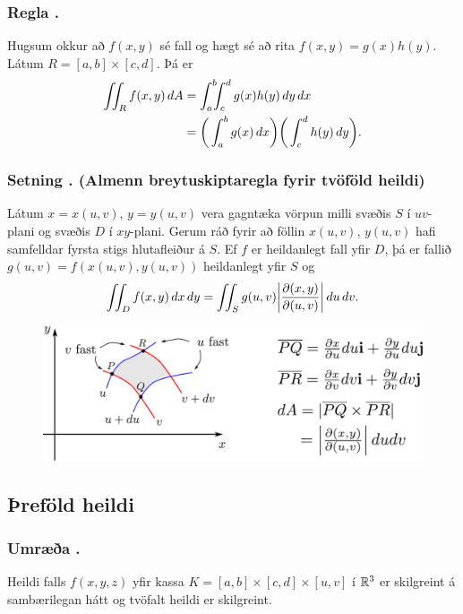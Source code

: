 \subsubsection{Regla \kaflanr.}
Hugsum okkur að $f(x,y)$ sé fall og hægt sé að rita
$f(x,y)=g(x)h(y)$.  Látum $R=[a,b]\times [c,d]$.  Þá er 
\begin{align*}
\int\!\!\!\int_R f(x,y)\,dA&=\int_a^b\!\!\!\int_{c}^{d}g(x)h(y)\,dy\, dx\\
&=\bigg(\int_a^b g(x)\,dx\bigg)\bigg(\int_c^d h(y)\,dy\bigg).
\end{align*}

 

\subsubsection{Setning \kaflanr. (Almenn breytuskiptaregla fyrir tvöföld heildi)}

Látum $x=x(u,v)$, $y=y(u,v)$ vera gagntæka vörpun milli svæðis $S$ í
$uv$-plani og svæðis $D$ í $xy$-plani.  Gerum ráð fyrir að föllin  
$x(u,v)$, $y(u,v)$ hafi samfelldar fyrsta stigs hlutafleiður á $S$.  Ef
$f$ er heildanlegt fall yfir $D$, þá er fallið $g(u,v)=f(x(u,v), y(u,v))$
heildanlegt yfir $S$ og 
$$\int\!\!\!\int_D f(x,y)\,dx\,dy=\int\!\!\!\int_S g(u,v)
\bigg|\frac{\partial(x,y)}{\partial(u,v)}\bigg|\,du\,dv.$$

\begin {figure}[h!]
 \centering
            \includegraphics[width=0.85\linewidth]{changevar}
\end {figure}




\subsection{Þreföld heildi} 

\subsubsection{Umræða \kaflanr.}
Heildi falls $f(x,y,z)$ yfir kassa $K=[a,b]\times[c,d]\times[u,v]$ í ${\mathbb R}^3$ er skilgreint á sambærilegan hátt og  tvöfalt heildi er skilgreint.  

